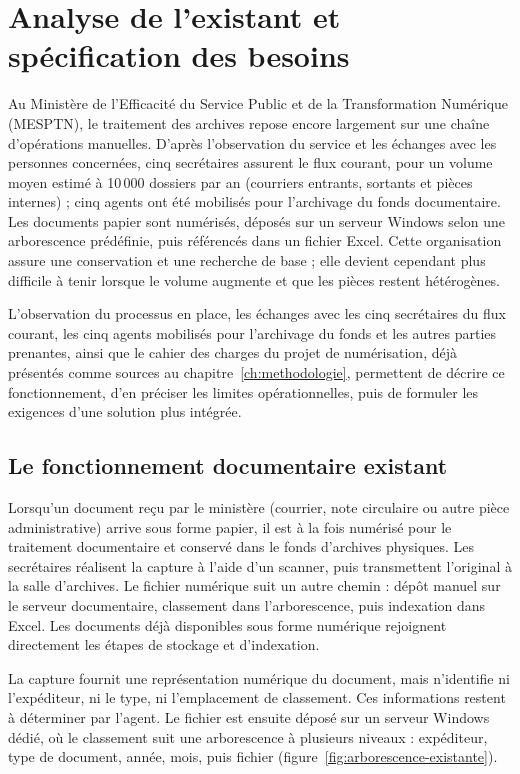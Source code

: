 \documentclass[12pt,a4paper]{report}
\newcommand{\nomMinistere}{Ministère de l'Efficacité du Service Public et de la Transformation Numérique (MESPTN)}
\begin{document}
\chapter[Analyse de l'existant]{Analyse de l'existant et spécification des besoins}
\label{ch:existant}
Au \nomMinistere{}, le traitement des archives repose encore largement sur une chaîne d'opérations manuelles. D'après l'observation du service et les échanges avec les personnes concernées, cinq secrétaires assurent le flux courant, pour un volume moyen estimé à 10\,000 dossiers par an (courriers entrants, sortants et pièces internes) ; cinq agents ont été mobilisés pour l'archivage du fonds documentaire. Les documents papier sont numérisés, déposés sur un serveur Windows selon une arborescence prédéfinie, puis référencés dans un fichier Excel. Cette organisation assure une conservation et une recherche de base ; elle devient cependant plus difficile à tenir lorsque le volume augmente et que les pièces restent hétérogènes.

L'observation du processus en place, les échanges avec les cinq secrétaires du flux courant, les cinq agents mobilisés pour l'archivage du fonds et les autres parties prenantes, ainsi que le cahier des charges du projet de numérisation, déjà présentés comme sources au chapitre~\ref{ch:methodologie}, permettent de décrire ce fonctionnement, d'en préciser les limites opérationnelles, puis de formuler les exigences d'une solution plus intégrée.

\section{Le fonctionnement documentaire existant}
Lorsqu'un document reçu par le ministère (courrier, note circulaire ou autre pièce administrative) arrive sous forme papier, il est à la fois numérisé pour le traitement documentaire et conservé dans le fonds d'archives physiques. Les secrétaires réalisent la capture à l'aide d'un scanner, puis transmettent l'original à la salle d'archives. Le fichier numérique suit un autre chemin : dépôt manuel sur le serveur documentaire, classement dans l'arborescence, puis indexation dans Excel. Les documents déjà disponibles sous forme numérique rejoignent directement les étapes de stockage et d'indexation.

La capture fournit une représentation numérique du document, mais n'identifie ni l'expéditeur, ni le type, ni l'emplacement de classement. Ces informations restent à déterminer par l'agent. Le fichier est ensuite déposé sur un serveur Windows dédié, où le classement suit une arborescence à plusieurs niveaux : expéditeur, type de document, année, mois, puis fichier (figure~\ref{fig:arborescence-existante}).
\end{document}
